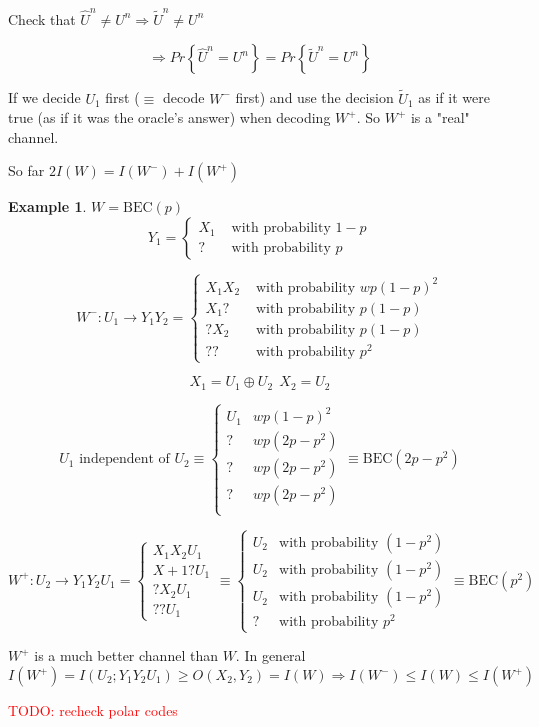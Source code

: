 \documentclass{article}
\theoremstyle{definition} %
\newtheorem{example}{Example}
\newcommand{\todo}[1]{\textcolor{red}{TODO: #1}}
\renewcommand{\Pr}[1]{Pr\left\{#1\right\}}
\begin{document}
Check that $\hat U^n \not = U^n \Rightarrow \tilde U^n \not = U^n$

\[
  \Rightarrow \Pr{\hat U ^n = U^n} = \Pr{\tilde U^n = U^n}
\]

If we decide $U_1$ first ($\equiv$ decode $W^-$ first) and use the decision $\tilde U_1$ as if it were true (as if it was the oracle's answer) when decoding $W^+$. So $W^+$ is a "real" channel.

So far $2I(W) = I(W^-) + I(W^+)$

\begin{example}
  $W=\text{BEC}(p)$
  \[
    Y_1 = \begin{cases}
      X_1 & \text{ with probability } 1 - p\\
      ? & \text{ with probability } p
    \end{cases}
  \]

  \[
    W^-:U_1 \rightarrow Y_1 Y_2 =
    \begin{cases}
      X_1X_2 & \text{ with probability } wp(1-p)^2\\
      X_1 ? & \text{ with probability } p(1-p)\\
      ?X_2 & \text{ with probability } p(1-p)\\
      ? ? & \text{ with probability } p^2
    \end{cases}
  \]

  \[
    X_1 = U_1 \oplus U_2~~X_2=U_2
  \]

  \[
    U_1 \text{ independent of } U_2 \equiv \begin{cases}
      U_1&wp(1-p)^2\\
      ?&wp(2p-p^2)\\
      ?&wp(2p-p^2)\\
      ?&wp(2p-p^2)\\
    \end{cases} \equiv \text{BEC}(2p - p^2)
  \]

  \[
    W^+:U_2 \rightarrow Y_1Y_2U_1 = \begin{cases}
      X_1X_2U_1\\
      X+1 ? U_1\\
      ?X_2 U_1\\
      ??U_1
    \end{cases}
    \equiv
    \begin{cases}
      U_2& \text{with probability } (1-p^2)\\
      U_2& \text{with probability } (1-p^2)\\
      U_2& \text{with probability } (1-p^2)\\
      ?& \text{with probability } p^2
    \end{cases}
    \equiv
    \text{BEC}(p^2)
  \]

  $W^+$ is a much better channel than $W$. In general
  \[
    I(W^+) = I(U_2;Y_1Y_2U_1) \geq O(X_2,Y_2) = I(W) \Rightarrow I(W^-) \leq I(W) \leq I(W^+)
  \]
\end{example}
  \todo{recheck polar codes}
\end{document}
